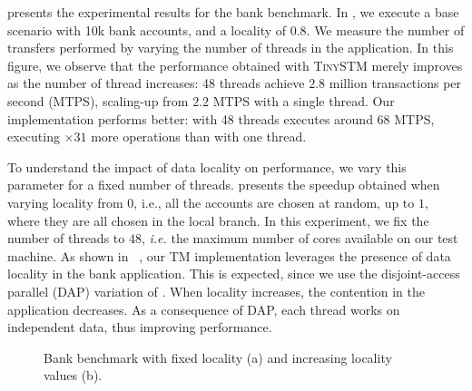  presents the experimental results for the bank benchmark.
In , we execute a base scenario with 10k bank accounts, and a locality of 0.8.
We measure the number of transfers performed by varying the number of threads in the application.
In this figure, we observe that the performance obtained with \textsc{TinySTM} merely improves as the number of thread increases: 48 threads achieve $2.8$ million transactions per second (MTPS), scaling-up from $2.2$ MTPS with a single thread.
Our implementation performs better: with 48 threads  executes around 68 MTPS, executing $\times 31$ more operations than with one thread.

To understand the impact of data locality on performance, we vary this parameter for a fixed number of threads.
 presents the speedup obtained when varying locality from $0$, i.e., all the accounts are chosen at random, up to $1$, where they are all chosen in the local branch.
In this experiment, we fix the number of threads to $48$, \emph{i.e.} the maximum number of cores available on our test machine.
As shown in ~, our TM implementation leverages the presence of data locality in the bank application.
This is expected, since we use the disjoint-access parallel (DAP) variation of .
When locality increases, the contention in the application decreases.
As a consequence of DAP, each thread works on independent data, thus improving performance.

\begin{figure}[!t]
  \centering
  \caption{
    Bank benchmark with fixed locality (a) and increasing locality values (b).
  }
\end{figure}

